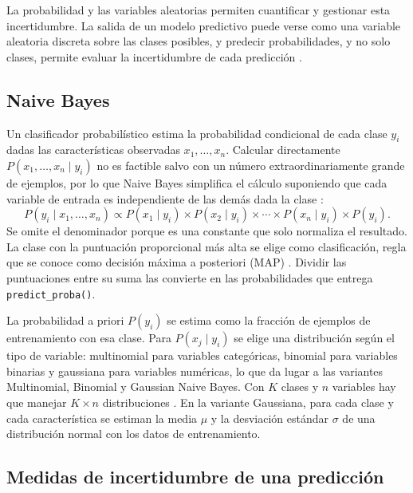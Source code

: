 \documentclass[11pt,letterpaper]{article}
\begin{document}
La probabilidad y las variables aleatorias permiten cuantificar y gestionar esta incertidumbre. La salida de un modelo predictivo puede verse como una variable aleatoria discreta sobre las clases posibles, y predecir probabilidades, y no solo clases, permite evaluar la incertidumbre de cada predicción \parencite{tecnm2026_documento_fuente,brownlee2020}.

\subsection{Naive Bayes}

Un clasificador probabilístico estima la probabilidad condicional de cada clase $y_i$ dadas las características observadas $x_1, \ldots, x_n$. Calcular directamente $P(x_1, \ldots, x_n \mid y_i)$ no es factible salvo con un número extraordinariamente grande de ejemplos, por lo que Naive Bayes simplifica el cálculo suponiendo que cada variable de entrada es independiente de las demás dada la clase \parencite{tecnm2026_documento_fuente,brownlee2020}:
\begin{equation}
    P(y_i \mid x_1, \ldots, x_n) \propto P(x_1 \mid y_i) \times P(x_2 \mid y_i) \times \cdots \times P(x_n \mid y_i) \times P(y_i).
\end{equation}
Se omite el denominador porque es una constante que solo normaliza el resultado. La clase con la puntuación proporcional más alta se elige como clasificación, regla que se conoce como decisión máxima a posteriori (MAP) \parencite{tecnm2026_documento_fuente}. Dividir las puntuaciones entre su suma las convierte en las probabilidades que entrega \texttt{predict\_proba()}.

La probabilidad a priori $P(y_i)$ se estima como la fracción de ejemplos de entrenamiento con esa clase. Para $P(x_j \mid y_i)$ se elige una distribución según el tipo de variable: multinomial para variables categóricas, binomial para variables binarias y gaussiana para variables numéricas, lo que da lugar a las variantes Multinomial, Binomial y Gaussian Naive Bayes. Con $K$ clases y $n$ variables hay que manejar $K \times n$ distribuciones \parencite{tecnm2026_documento_fuente}. En la variante Gaussiana, para cada clase y cada característica se estiman la media $\mu$ y la desviación estándar $\sigma$ de una distribución normal con los datos de entrenamiento.

\subsection{Medidas de incertidumbre de una predicción}
\end{document}
